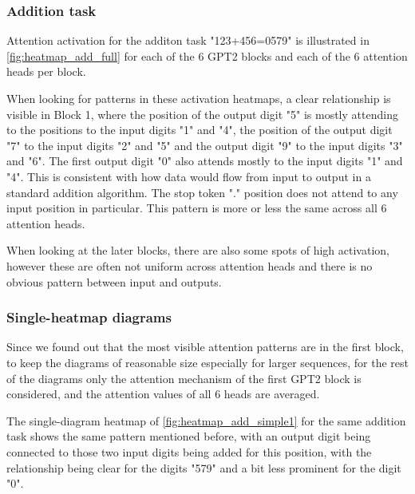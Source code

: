 \subsubsection{Addition task}


Attention activation for the additon task "123+456=0579" is illustrated in \cref{fig:heatmap_add_full} for each of the 6 GPT2 blocks and each of the 6 attention heads per block.

When looking for patterns in these activation heatmaps, a clear relationship is visible in Block 1, where the position of the output digit "5" is mostly attending to the positions to the input digits "1" and "4", the position of the output digit "7" to the input digits "2" and "5" and the output digit "9" to the input digits "3" and "6". The first output digit "0" also attends mostly to the input digits "1" and "4". This is consistent with how data would flow from input to output in a standard addition algorithm. The stop token "." position does not attend to any input position in particular.
This pattern is more or less the same across all 6 attention heads.

When looking at the later blocks, there are also some spots of high activation, however these are often not uniform across attention heads and there is no obvious pattern between input and outputs.

\subsubsection{Single-heatmap diagrams}

Since we found out that the most visible attention patterns are in the first block, to keep the diagrams of reasonable size especially for larger sequences, for the rest of the diagrams only the attention mechanism of the first GPT2 block is considered, and the attention values of all 6 heads are averaged.


The single-diagram heatmap of \cref{fig:heatmap_add_simple1} for the same addition task shows the same pattern mentioned before, with an output digit being connected to those two input digits being added for this position, with the relationship being clear for the digits "579" and a bit less prominent for the digit "0".

